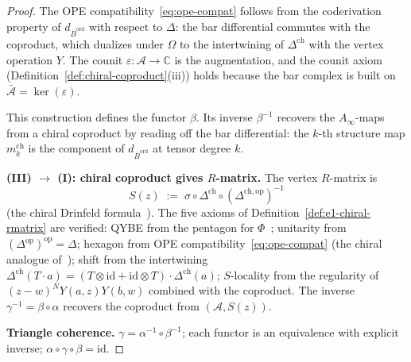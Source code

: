 \documentclass[11pt,reqno]{amsart}
\theoremstyle{definition}
\theoremstyle{remark}
\newcommand{\cA}{\mathcal{A}}
\newcommand{\Ainf}{A_{\infty}}
\newcommand{\Barord}{\overline{B}^{\mathrm{ord}}}
\newcommand{\CC}{\mathbb{C}}
\newcommand{\id}{\mathrm{id}}
\newcommand{\op}{\mathrm{op}}
\numberwithin{equation}{section}
\begin{document}
\begin{proof}
The OPE compatibility~\eqref{eq:ope-compat} follows from
the coderivation property of $d_{\Barord}$ with respect
to $\Delta$: the bar differential commutes with the
coproduct, which dualizes under $\Omega$ to the
intertwining of $\Delta^{\mathrm{ch}}$ with the vertex
operation $Y$. The counit
$\varepsilon \colon \cA \to \CC$ is the augmentation, and
the counit axiom
(Definition~\ref{def:chiral-coproduct}(iii)) holds because
the bar complex is built on
$\bar{\cA} = \ker(\varepsilon)$.

This construction defines the functor $\beta$. Its
inverse $\beta^{-1}$ recovers the $\Ainf$-maps from a
chiral coproduct by reading off the bar differential: the
$k$-th structure map $m_k^{\mathrm{ch}}$ is the component
of $d_{\Barord}$ at tensor degree $k$.

\medskip
\noindent
\textbf{(III) $\boldsymbol{\to}$ (I): chiral coproduct
gives $R$-matrix.}
The vertex $R$-matrix is
\begin{equation}\label{eq:r-from-coprod-proof}
  S(z)
  \;:=\; \sigma \circ \Delta^{\mathrm{ch}}
  \circ (\Delta^{\mathrm{ch},\op})^{-1}
\end{equation}
(the chiral Drinfeld formula~\cite{Drinfeld90}).
The five axioms of
Definition~\ref{def:e1-chiral-rmatrix} are verified:
QYBE from the pentagon for $\Phi$~\cite{Drinfeld90,EK96};
unitarity from $(\Delta^{\op})^{\op} = \Delta$;
hexagon from OPE compatibility~\eqref{eq:ope-compat}
(the chiral analogue of~\cite{Drinfeld90});
shift from the intertwining
$\Delta^{\mathrm{ch}}(T \cdot a)
= (T \otimes \id + \id \otimes T) \cdot
\Delta^{\mathrm{ch}}(a)$;
$S$-locality from the regularity of
$(z{-}w)^N Y(a,z)Y(b,w)$ combined with the coproduct.
The inverse $\gamma^{-1} = \beta \circ \alpha$ recovers
the coproduct from $(\cA, S(z))$.

\medskip
\noindent
\textbf{Triangle coherence.}
$\gamma = \alpha^{-1} \circ \beta^{-1}$; each functor is
an equivalence with explicit inverse;
$\alpha \circ \gamma \circ \beta = \id$.
\end{proof}
\end{document}
